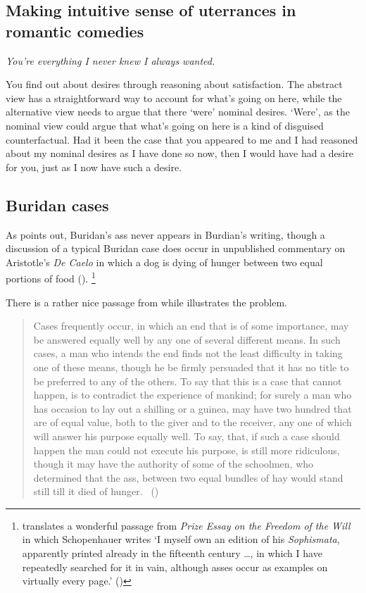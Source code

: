 \documentclass[10pt]{article}
\begin{document}
\subsection{Making intuitive sense of uterrances in romantic comedies}
\label{sec:making-intu-sense}

\emph{You're everything I never knew I always wanted.}

You find out about desires through reasoning about satisfaction.
The abstract view has a straightforward way to account for what's going on here, while the alternative view needs to argue that there `were' nominal desires.
`Were', as the nominal view could argue that what's going on here is a kind of disguised counterfactual.
Had it been the case that you appeared to me and I had reasoned about my nominal desires as I have done so now, then I would have had a desire for you, just as I now have such a desire.


\subsection{Buridan cases}
\label{sec:buridan-cases-1}

As \citeauthor{Rescher:1960aa} points out, Buridan's ass never appears in Burdian's writing, though a discussion of a typical Buridan case does occur in unpublished commentary on Aristotle's \emph{De Caelo} in which a dog is dying of hunger between two equal portions of food (\citeyear[154]{Rescher:1960aa}).\nolinebreak
\footnote{\citeauthor{Rescher:1960aa} translates a wonderful passage from \emph{Prize Essay on the Freedom of the Will} in which Schopenhauer writes `I myself own an edition of his \emph{Sophismata}, apparently printed already in the fifteenth century \dots, in which I have repeatedly searched for it in vain, although asses occur as examples on virtually every page.' (\citeyear[153]{Rescher:1960aa})}


There is a rather nice passage from \citeauthor{Reid:1815aa} while illustrates the problem.

\begin{quote}
  Cases frequently occur, in which an end that is of some importance, may be answered equally well by any one of several different means.
  In such cases, a man who intends the end finds not the least difficulty in taking one of these means, though he be firmly persuaded that it has no title to be preferred to any of the others.
  To say that this is a case that cannot happen, is to contradict the experience of mankind; for surely a man who has occasion to lay out a shilling or a guinea, may have two hundred that are of equal value, both to the giver and to the receiver, any one of which will answer his purpose equally well.
  To say, that, if such a case should happen the man could not execute his purpose, is still more ridiculous, though it may have the authority of some of the schoolmen, who determined that the ass, between two equal bundles of hay would stand still till it died of hunger.\nolinebreak
  \mbox{ }\hfill(\citeyear[233--234]{Reid:1815aa})
\end{quote}
\end{document}
